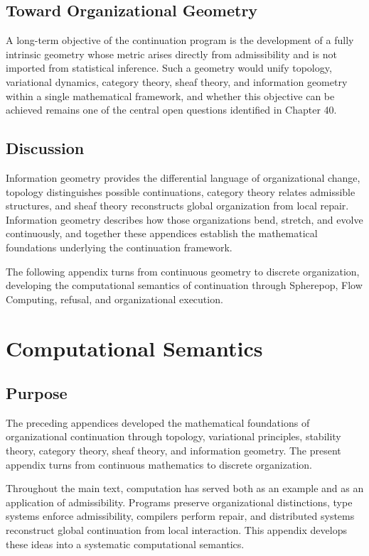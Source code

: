 \documentclass[11pt,oneside]{book}
\numberwithin{equation}{chapter}
\theoremstyle{definition}
\theoremstyle{plain}
\begin{document}
\section{Toward Organizational Geometry}

A long-term objective of the continuation program is the development of a fully intrinsic geometry whose metric arises directly from admissibility and is not imported from statistical inference. Such a geometry would unify topology, variational dynamics, category theory, sheaf theory, and information geometry within a single mathematical framework, and whether this objective can be achieved remains one of the central open questions identified in Chapter 40.

\section{Discussion}

Information geometry provides the differential language of organizational change, topology distinguishes possible continuations, category theory relates admissible structures, and sheaf theory reconstructs global organization from local repair. Information geometry describes how those organizations bend, stretch, and evolve continuously, and together these appendices establish the mathematical foundations underlying the continuation framework.

The following appendix turns from continuous geometry to discrete organization, developing the computational semantics of continuation through Spherepop, Flow Computing, refusal, and organizational execution.

\chapter{Computational Semantics}

\section{Purpose}

The preceding appendices developed the mathematical foundations of
organizational continuation through topology, variational principles,
stability theory, category theory, sheaf theory, and information
geometry. The present appendix turns from continuous mathematics to
discrete organization.

Throughout the main text, computation has served both as an example and
as an application of admissibility. Programs preserve organizational
distinctions, type systems enforce admissibility, compilers perform
repair, and distributed systems reconstruct global continuation from
local interaction. This appendix develops these ideas into a systematic
computational semantics.
\end{document}
